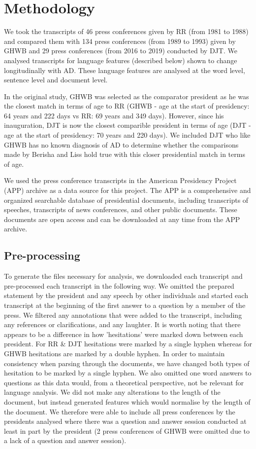 \documentclass[12pt]{article}
\begin{document}
\section{Methodology}\label{methodology}
We took the transcripts of 46 press conferences given by RR (from 1981 to 1988) and compared them with 134 press conferences (from 1989 to 1993) given by GHWB and 29 press conferences (from 2016 to 2019) conducted by DJT.  We analysed transcripts for language features (described below) shown to change longitudinally with AD. These language features are analysed at the word level, sentence level and document level. 
\par 
In the original study, GHWB was selected as the comparator president as he was the closest match in terms of age to RR (GHWB - age at the start of presidency: 64 years and 222 days vs RR: 69 years and 349 days). However, since his inauguration, DJT is now the closest comparible president in terms of age (DJT - age at the start of presidency: 70 years and 220 days). We included DJT who like GHWB has no known diagnosis of AD to determine whether the comparisons made by Berisha and Liss hold true with this closer presidential match in terms of age. 
\par 
We used the press conference transcripts in the American Presidency Project (APP) archive as a data source for this project. The APP is a comprehensive and organized searchable database of presidential documents, including transcripts of speeches, transcripts of news conferences, and other public documents. These documents are open access and can be downloaded at any time from the APP archive.

\subsection{Pre-processing}
To generate the files necessary for analysis, we downloaded each transcript and pre-processed each transcript in the following way. We omitted the prepared statement by the president and any speech by other individuals and started each transcript at the beginning of the first answer to a question by a member of the press. We filtered any annotations that were added to the transcript, including any references or clarifications, and any laughter. It is worth noting that there appears to be a difference in how 'hesitations' were marked down between each president. For RR \& DJT hesitations were marked by a single hyphen whereas for GHWB hesitations are marked by a double hyphen. In order to maintain consistency when parsing through the documents, we have changed both types of hesitation to be marked by a single hyphen. We also omitted one word answers to questions as this data would, from a theoretical perspective, not be relevant for language analysis. We did not make any alterations to the length of the document, but instead generated features which would normalise by the length of the document. We therefore were able to include all press conferences by the presidents analysed where there was a question and answer session conducted at least in part by the president (2 press conferences of GHWB were omitted due to a lack of a question and answer session).
\end{document}
